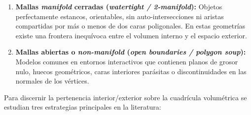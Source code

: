 \begin{enumerate}
  \item \textbf{Mallas \textit{manifold} cerradas (\textit{watertight / 2-manifold}):} Objetos perfectamente estancos, orientables, sin auto-intersecciones ni aristas compartidas por más o menos de dos caras poligonales. En estas geometrías existe una frontera inequívoca entre el volumen interno y el espacio exterior.
  \item \textbf{Mallas abiertas o \textit{non-manifold} (\textit{open boundaries / polygon soup}):} Modelos comunes en entornos interactivos que contienen planos de grosor nulo, huecos geométricos, caras interiores parásitas o discontinuidades en las normales de los vértices.
\end{enumerate}

Para discernir la pertenencia interior/exterior sobre la cuadrícula volumétrica se estudian tres estrategias principales en la literatura:

